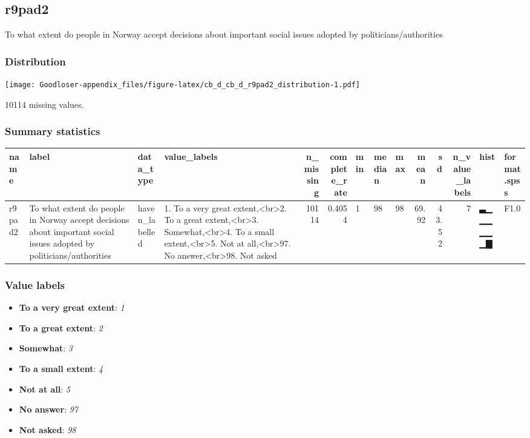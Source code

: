 \documentclass[
]{book}
\providecommand{\tightlist}{%
  \setlength{\itemsep}{0pt}\setlength{\parskip}{0pt}}
\begin{document}
\hypertarget{r9pad2}{%
\subsection{r9pad2}\label{r9pad2}}

To what extent do people in Norway accept decisions about important social issues adopted by politicians/authorities

\hypertarget{r9pad2_distribution}{%
\subsubsection{Distribution}\label{r9pad2_distribution}}

\texttt{[image: Goodloser-appendix\_files/figure-latex/cb\_d\_cb\_d\_r9pad2\_distribution-1.pdf]}

10114 missing values.

\hypertarget{r9pad2_summary}{%
\subsubsection{Summary statistics}\label{r9pad2_summary}}

\begin{tabular}{l|l|l|l|r|r|l|l|l|r|r|r|l|l}
\hline
name & label & data_type & value_labels & n_missing & complete_rate & min & median & max & mean & sd & n_value_labels & hist & format.spss\\
\hline
r9pad2 & To what extent do people in Norway accept decisions about important social issues adopted by politicians/authorities & haven_labelled & 1. To a very great extent,<br>2. To a great extent,<br>3. Somewhat,<br>4. To a small extent,<br>5. Not at all,<br>97. No answer,<br>98. Not asked & 10114 & 0.4054 & 1 & 98 & 98 & 69.92 & 43.52 & 7 & ▃▁▁▁▁▁▁▇ & F1.0\\
\hline
\end{tabular}

\hypertarget{r9pad2_labels}{%
\subsubsection{Value labels}\label{r9pad2_labels}}

\begin{itemize}
\tightlist
\item
  \textbf{To a very great extent}: \emph{1}
\item
  \textbf{To a great extent}: \emph{2}
\item
  \textbf{Somewhat}: \emph{3}
\item
  \textbf{To a small extent}: \emph{4}
\item
  \textbf{Not at all}: \emph{5}
\item
  \textbf{No answer}: \emph{97}
\item
  \textbf{Not asked}: \emph{98}
\end{itemize}
\end{document}

